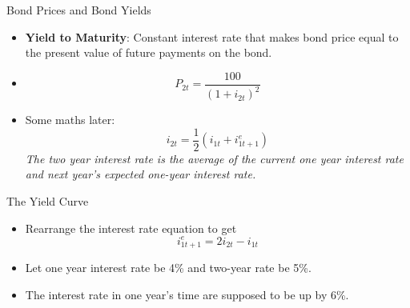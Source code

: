 \documentclass[shownotes,11pt, aspectratio=169]{beamer}
\begin{document}
\begin{frame}{Bond Prices and Bond Yields}
\begin{itemize}
\item \textbf{Yield to Maturity}: Constant interest rate that makes bond price equal to the present value of future payments on the bond. \pause
\item \[ P_{2t} = \frac{100}{(1 + i_{2t})^2} \] \pause
\item Some maths later: \[ i_{2t} = \frac{1}{2}(i_{1t} + i_{1t+1}^e) \]
\textit{The two year interest rate is the average of the current one year interest rate and next year's expected one-year interest rate.}
\end{itemize}
\end{frame}

\begin{frame}{The Yield Curve}
\begin{itemize}
\item Rearrange the interest rate equation to get
     \[ i^e_{1t + 1} = 2i_{2t} - i_{1t} \]
\item Let one year interest rate be 4\% and two-year rate be 5\%.
\item The interest rate in one year's time are supposed to be up by 6\%.
\end{itemize}
\end{frame}
\end{document}
